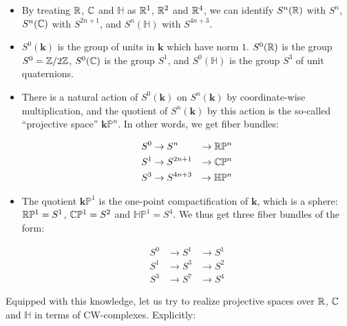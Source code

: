 \documentclass[a4paper]{amsart}
\newcommand{\field}{\mathbf{k}}
\newcommand{\Quat}{\mathbb{H}}
\begin{document}
\begin{itemize}

\item By treating $\mathbb{R}$, $\mathbb{C}$ and $\Quat$ as $\mathbb{R}^1$, $\mathbb{R}^2$ and $\mathbb{R}^4$,
  we can identify $S^n(\mathbb{R})$ with $S^n$, $S^n(\mathbb{C})$ with $S^{2n+1}$, and
  $S^n(\Quat)$ with $S^{4n+3}$.

\item $S^0(\field)$ is the group of units in $\field$ which have norm
  $1$. $S^0(\mathbb{R})$ is the group $S^0 = \mathbb{Z}/2\mathbb{Z}$, $S^0(\mathbb{C})$ is the group $S^1$,
  and $S^0(\Quat)$ is the group $S^3$ of unit quaternions.

\item There is a natural action of $S^0(\field)$ on $S^n(\field)$ by
  coordinate-wise multiplication, and the quotient of $S^n(\field)$ by
  this action is the so-called ``projective space'' $\field \mathbb{P}^n$.
  In other words, we get fiber bundles:

  \begin{eqnarray*}
    S^0 & \to S^n & \to \R\mathbb{P}^n\\
    S^1 & \to S^{2n+1} & \to \C\mathbb{P}^n\\
    S^3 & \to S^{4n+3} & \to \Quat \mathbb{P}^n
  \end{eqnarray*}

\item The quotient $\field\mathbb{P}^1$ is the one-point
  compactification of $\field$, which is a sphere: $\mathbb{R}\mathbb{P}^1 =
  S^1$, $\mathbb{C}\mathbb{P}^1 = S^2$ and $\Quat \mathbb{P}^1 = S^4$. We thus
  get three fiber bundles of the form:

  \begin{eqnarray*}
    S^0 & \to S^1 & \to S^1 \\
    S^1 & \to S^3 & \to S^2 \\
    S^3 & \to S^7 & \to S^4
  \end{eqnarray*}

\end{itemize}

Equipped with this knowledge, let us try to realize projective spaces
over $\mathbb{R}$, $\mathbb{C}$ and $\Quat$ in terms of CW-complexes. Explicitly:
\end{document}
